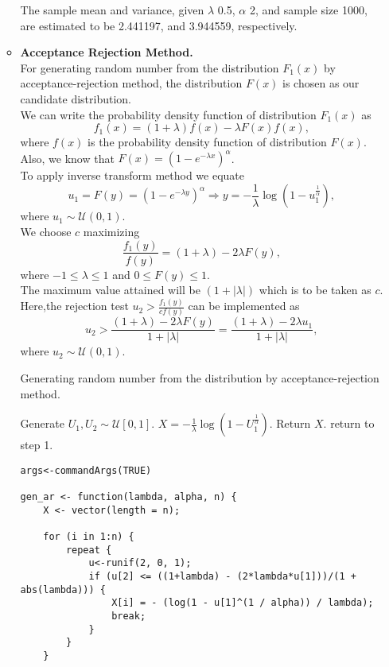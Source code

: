 \documentclass[11pt]{article}
\begin{document}
\begin{enumerate}
\begin{itemize}
The sample mean and variance, given $\lambda$ 0.5, $\alpha$ 2, and sample size 1000, are estimated to be 2.441197, and 3.944559, respectively.
\newpage
\item \textbf{Acceptance Rejection Method.}\\
For generating random number from the distribution $F_{1}(x)$ by acceptance-rejection method, the distribution $F(x)$ is chosen as our candidate distribution.\\
We can write the probability density function of distribution $F_{1}(x)$ as
$$f_{1}(x) = (1 + \lambda)f(x) - \lambda F(x) f(x),$$
where $f(x)$ is the probability density function of distribution $F(x)$.\\
Also, we know that $F(x) = (1-e^{- \lambda x})^{\alpha}$.\\
To apply inverse transform method we equate $$u_{1} = F(y) = (1-e^{- \lambda y})^{\alpha}   \Rightarrow   y = - \frac{1}{\lambda} \log(1 - u_{1}^{\frac{1}{\alpha}}),$$ where $u_{1} \sim \mathcal{U}(0,1)$.\\
We choose $c$ maximizing $$\frac{f_{1}(y)}{f(y)} = (1 + \lambda) - 2 \lambda F(y),$$ where $-1 \leq \lambda \leq 1$ and $0 \leq F(y) \leq 1$.\\
The maximum value attained will be $(1 + |\lambda|)$ which is to be taken as $c$.\\
Here,the rejection test $u_{2} > \frac{f_{1}(y)}{cf(y)}$ can be implemented as $$u_{2} > \frac{(1 + \lambda) - 2 \lambda F(y)}{1 + |\lambda|} = \frac{(1 + \lambda) - 2 \lambda u_{1}}{1 + |\lambda|},$$ where $u_{2} \sim \mathcal{U}(0,1)$.

\begin{algorithm}[H]
\caption{Generating random number from the distribution by acceptance-rejection method.}
\begin{algorithmic}[1]
\STATE Generate $U_1, U_2 \sim \mathcal{U}[0,1]$.
	\STATE $X = - \frac{1}{\lambda} \log(1 - U_{1}^{\frac{1}{\alpha}})$.
	\STATE Return $X$.
\ELSE
	\STATE return to step 1.
\ENDIF
\end{algorithmic}
\end{algorithm}
\newpage
{}
\begin{lstlisting}
args<-commandArgs(TRUE)

gen_ar <- function(lambda, alpha, n) {
	X <- vector(length = n);

	for (i in 1:n) {
		repeat {
			u<-runif(2, 0, 1);
			if (u[2] <= ((1+lambda) - (2*lambda*u[1]))/(1 + abs(lambda))) {
				X[i] = - (log(1 - u[1]^(1 / alpha)) / lambda);
				break;
			}
		}
	}


\end{lstlisting}
\end{itemize}
\end{enumerate}
\end{document}
